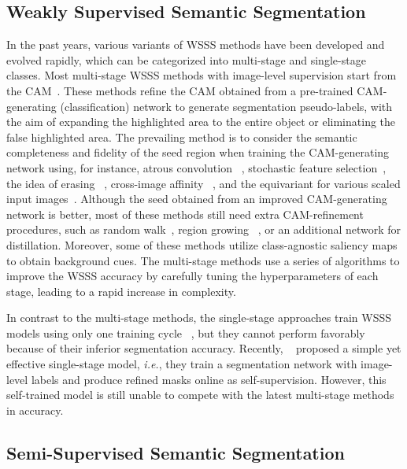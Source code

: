 \documentclass[twocolumn]{svjour3}          \smartqed  \usepackage{graphicx}
\begin{document}
\subsection{Weakly Supervised Semantic Segmentation}
\label{sec:wsss_related}
In the past years, various variants of WSSS methods have been developed and evolved rapidly, which can be categorized into multi-stage and single-stage classes.
Most multi-stage WSSS methods with image-level supervision start from the CAM~\citep{ZhouKLOT16:CAM}.
These methods refine the CAM obtained from a pre-trained CAM-generating (classification) network to generate segmentation pseudo-labels, with the aim of expanding the highlighted area to the entire object or eliminating the false highlighted area.
The prevailing method is to consider the semantic completeness and fidelity of the seed region when training the CAM-generating network using, for instance, atrous convolution ~\citep{WeiXSJFH18:mdc}, stochastic feature selection~\citep{LeeKLLY19:FickleNet}, the idea of erasing ~\citep{WeiFLCZY17:AdverErasing,HouJWC18:SelfErasing}, cross-image affinity ~\citep{SunWDG20:MCIS}, and the equivariant for various scaled input images~\citep{WangZKSC20:SEAM}.
Although the seed obtained from an improved CAM-generating network is better, most of these methods still need extra CAM-refinement procedures, such as random walk~\citep{AhnK18:PSA}, region growing ~\citep{HuangWWLW18:DSRG}, or an additional network for distillation.
Moreover, some of these methods utilize class-agnostic saliency maps to obtain background cues.
The multi-stage methods use a series of algorithms to improve the WSSS accuracy by carefully tuning the hyperparameters of each stage, leading to a rapid increase in complexity.

In contrast to the multi-stage methods, the single-stage approaches train WSSS models using only one training cycle ~\citep{PinheiroC15:fromimage,PapandreouCMY15:EM,Zheng15:CRFRNN}, but they cannot perform favorably because of their inferior segmentation accuracy.
Recently, ~\citep{Araslanov020:SingleStage} proposed a simple yet effective single-stage model, \textit{i.e.}, they train a segmentation network with image-level labels and produce refined masks online as self-supervision. However, this self-trained model is still unable to compete with the latest multi-stage methods~\cite{AhnCK19:IRN,LeeKLLY19:FickleNet,WangZKSC20:SEAM} in accuracy.

\subsection{Semi-Supervised Semantic Segmentation}
\end{document}

